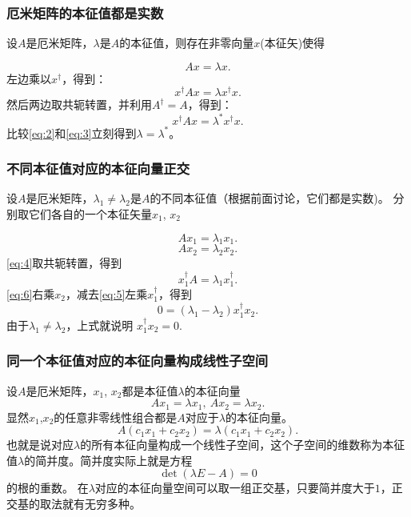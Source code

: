 \documentclass[CJK]{beamer}
\begin{document}
\begin{frame}
  \frametitle{厄米矩阵的本征值都是实数}
  设$A$是厄米矩阵，$\lambda$是$A$的本征值，则存在非零向量$x$(本征矢)使得

  \begin{equation}
    A x = \lambda x. \label{eq:1}
  \end{equation}
  左边乘以$x^\dagger$，得到：
  \begin{equation}
      x^\dagger A x  = \lambda x^\dagger x. \label{eq:2}
  \end{equation}
  然后两边取共轭转置，并利用$A^\dagger = A$，得到：
  \begin{equation}
      x^\dagger A x  = \lambda^* x^\dagger x. \label{eq:3}
  \end{equation}
  比较\eqref{eq:2}和\eqref{eq:3}立刻得到$\lambda = \lambda^*$。  
\end{frame}


\begin{frame}
  \frametitle{不同本征值对应的本征向量正交}
  设$A$是厄米矩阵，$\lambda_1 \ne \lambda_2$是$A$的不同本征值（根据前面讨论，它们都是实数)。 分别取它们各自的一个本征矢量$x_1$, $x_2$

    \begin{equation}
      Ax_1 = \lambda_1 x_1. \label{eq:4}
    \end{equation}
    \begin{equation}
      Ax_2 = \lambda_2 x_2. \label{eq:5}
    \end{equation}
    \eqref{eq:4}取共轭转置，得到
    \begin{equation}
      x_1^\dagger A = \lambda_1 x_1^\dagger. \label{eq:6}
    \end{equation}
    \eqref{eq:6}右乘$x_2$，减去\eqref{eq:5}左乘$x_1^\dagger$，得到
    $$ 0 = (\lambda_1-\lambda_2)x_1^\dagger x_2 . $$
    由于$\lambda_1\ne \lambda_2$，上式就说明  $x_1^\dagger x_2 = 0.$
\end{frame}

\begin{frame}
  \frametitle{同一个本征值对应的本征向量构成线性子空间}
  设$A$是厄米矩阵，$x_1$, $x_2$都是本征值$\lambda$的本征向量
  $$Ax_1 =\lambda x_1,\  Ax_2 = \lambda x_2 .$$
  显然$x_1$,$x_2$的任意非零线性组合都是$A$对应于$\lambda$的本征向量。
  $$A(c_1x_1 +c_2x_2) = \lambda(c_1x_1+c_2x_2).$$
  也就是说对应$\lambda$的所有本征向量构成一个线性子空间，这个子空间的维数称为本征值$\lambda$的简并度。简并度实际上就是方程
  $$ \det\left( \lambda E - A\right) = 0 $$
  的根的重数。  
  在$\lambda$对应的本征向量空间可以取一组正交基，只要简并度大于$1$，正交基的取法就有无穷多种。
\end{frame}
\end{document}
